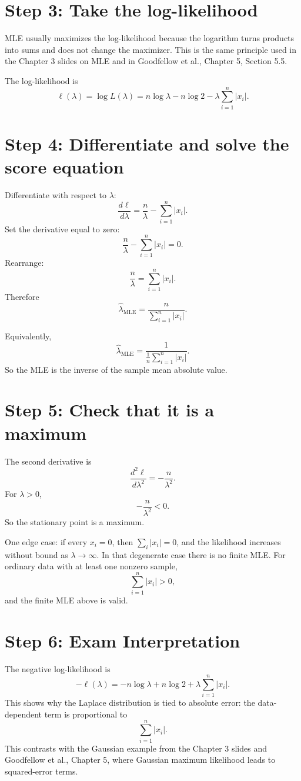 \documentclass[11pt]{article}
\begin{document}
\section*{Step 3: Take the log-likelihood}

MLE usually maximizes the log-likelihood because the logarithm turns products into sums and does not change the maximizer. This is the same principle used in the Chapter 3 slides on MLE and in Goodfellow et al., Chapter 5, Section 5.5.

The log-likelihood is
\[
\ell(\lambda)
=
\log L(\lambda)
=
n\log\lambda-n\log 2-\lambda\sum_{i=1}^{n}|x_i|.
\]

\section*{Step 4: Differentiate and solve the score equation}

Differentiate with respect to $\lambda$:
\[
\frac{d\ell}{d\lambda}
=
\frac{n}{\lambda}
-
\sum_{i=1}^{n}|x_i|.
\]
Set the derivative equal to zero:
\[
\frac{n}{\lambda}
-
\sum_{i=1}^{n}|x_i|
=0.
\]
Rearrange:
\[
\frac{n}{\lambda}
=
\sum_{i=1}^{n}|x_i|.
\]
Therefore
\[
\boxed{
\hat{\lambda}_{\mathrm{MLE}}
=
\frac{n}{\sum_{i=1}^{n}|x_i|}
}.
\]

Equivalently,
\[
\boxed{
\hat{\lambda}_{\mathrm{MLE}}
=
\frac{1}{\frac{1}{n}\sum_{i=1}^{n}|x_i|}
}.
\]
So the MLE is the inverse of the sample mean absolute value.

\section*{Step 5: Check that it is a maximum}

The second derivative is
\[
\frac{d^2\ell}{d\lambda^2}
=
-\frac{n}{\lambda^2}.
\]
For $\lambda>0$,
\[
-\frac{n}{\lambda^2}<0.
\]
So the stationary point is a maximum.

One edge case: if every $x_i=0$, then $\sum_i |x_i|=0$, and the likelihood increases without bound as $\lambda\rightarrow\infty$. In that degenerate case there is no finite MLE. For ordinary data with at least one nonzero sample,
\[
\sum_{i=1}^{n}|x_i|>0,
\]
and the finite MLE above is valid.

\section*{Step 6: Exam Interpretation}

The negative log-likelihood is
\[
-\ell(\lambda)
=
-n\log\lambda+n\log 2+\lambda\sum_{i=1}^{n}|x_i|.
\]
This shows why the Laplace distribution is tied to absolute error: the data-dependent term is proportional to
\[
\sum_{i=1}^{n}|x_i|.
\]
This contrasts with the Gaussian example from the Chapter 3 slides and Goodfellow et al., Chapter 5, where Gaussian maximum likelihood leads to squared-error terms.
\end{document}
